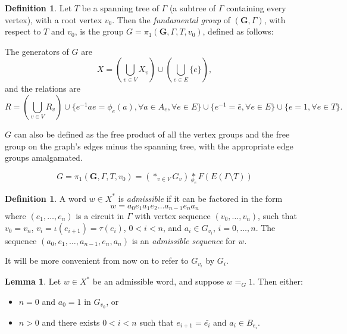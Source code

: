 \documentclass[a4paper]{article}
\newcommand{\fgoagog}{\pi_1(\mathbf{G},\Gamma,T,v_0)}	%
\theoremstyle{plain}
\theoremstyle{definition}
\newtheorem{lemma}[theorem]{Lemma}
\newtheorem{definition}[theorem]{Definition}
\begin{document}
\begin{definition}
Let $T$ be a spanning tree of $\Gamma$ (a subtree of $\Gamma$ containing every vertex), with a root vertex $v_0$. Then the {\it fundamental group} of $(\mathbf{G},\Gamma)$, with respect to $T$ and $v_0$, is the group $G = \fgoagog$, defined as follows:

The generators of $G$ are
\[ X = \left( \bigcup_{v \in V}X_v \right) \cup \left( \bigcup_{e \in E}\{e\} \right),\]
and the relations are 
\[ R = \left( \bigcup_{v \in V}R_v \right) \cup \{e^{-1}ae = \phi_e(a),  \forall a \in A_e, \forall e \in E\} \cup \{ e^{-1} = \bar{e}, \forall e \in E\} \cup \{ e = 1, \forall e \in T \}.\]

$G$ can also be defined as the free product of all the vertex groups and the free group on the graph's edges minus the spanning tree, with the appropriate edge groups amalgamated.

\begin{equation}
G = \fgoagog = \left( \ast_{v \in V} G_v \right) \underset{\phi_e}{\ast} F(E(\Gamma \setminus T))
\end{equation}

\end{definition}

\begin{definition}
A word $w \in X^{\ast}$ is {\it admissible} if it can be factored in the form
\[ w = a_0 e_1 a_1 e_2 \dots a_{n-1} e_n a_n \]
where $(e_1,\dots,e_n)$ is a circuit in $\Gamma$ with vertex sequence $(v_0,\dots,v_n)$, such that $v_0 = v_n$, $v_i = \iota(e_{i+1})=\tau(e_i)$, $0 < i < n$, and $a_i \in G_{v_i}$, $i=0,\dots,n$. The sequence $(a_0,e_1, \dots, a_{n-1},e_n,a_n)$ is an {\it admissible sequence} for $w$.
\end{definition}

It will be more convenient from now on to refer to $G_{v_i}$ by $G_i$.

\begin{lemma}
	\label{trivialnormalform} \cite[2.4]{Kapovich_2005}
Let $w \in X^{\ast}$ be an admissible word, and suppose $w =_G 1$. Then either:
\begin{itemize}
	\item $n=0$ and $a_0=1$ in $G_{v_0}$, or
	\item $n > 0$ and there exists $0<i<n$ such that $e_{i+1}=\bar{e_i}$ and $a_i \in B_{e_i}$.
\end{itemize}
\end{lemma}
\end{document}
